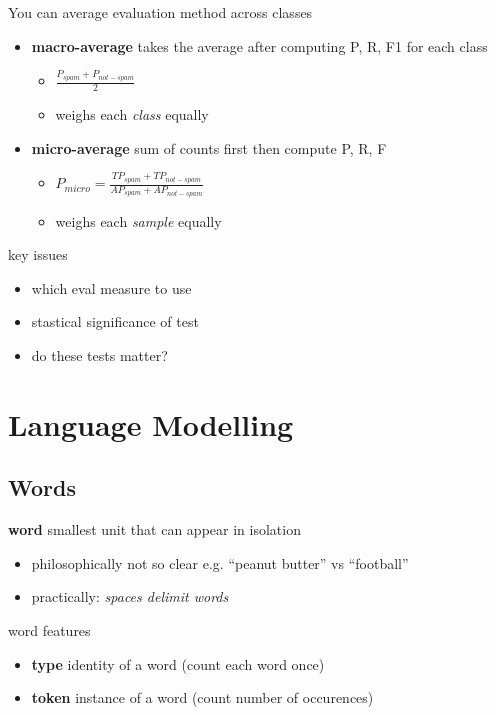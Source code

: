 \documentclass[]{article}
\theoremstyle{definition}
\begin{document}
You can average evaluation method across classes
\begin{itemize}
    \item \textbf{macro-average} takes the average after computing P, R, F1 for each class
        \begin{itemize}
            \item $\frac{P_{spam} + P_{not-spam}}{2}$
            \item weighs each \textit{class} equally
        \end{itemize}
    \item \textbf{micro-average} sum of counts first then compute P, R, F
        \begin{itemize}
            \item $P_{micro} = \frac{TP_{spam} + TP_{not-spam}}{AP_{spam} + AP_{not-spam}}$
            \item weighs each \textit{sample} equally
        \end{itemize}
\end{itemize}

key issues
\begin{itemize}
    \item which eval measure to use
    \item stastical significance of test
    \item do these tests matter?
\end{itemize}

\section{Language Modelling}%
\label{sec:language_modelling}

\subsection{Words}%
\label{sub:words}

\textbf{word} smallest unit that can appear in isolation
\begin{itemize}
    \item philosophically not so clear e.g. ``peanut butter'' vs ``football''
    \item practically: \textit{spaces delimit words}
\end{itemize}

word features
\begin{itemize}
    \item \textbf{type} identity of a word (count each word once)
    \item \textbf{token} instance of a word (count number of occurences)
\end{itemize}
\end{document}
